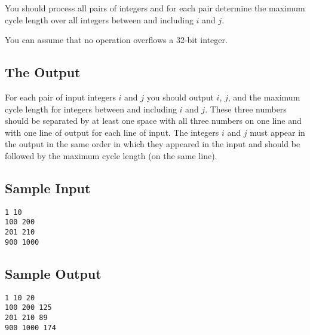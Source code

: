 You should process all pairs of integers and for each
pair determine the maximum cycle length over all integers between and
including $i$ and $j$.

You can assume that no operation overflows a 32-bit integer.


\subsection*{The Output}

For each pair of input integers $i$ and $j$ you should output $i$, $j$,
and the maximum cycle length for integers between and including
$i$ and $j$.  These three numbers
should be separated by at least one space with all three numbers on one
line and with one line of output for each line of input.  The integers
$i$ and $j$ must appear in the output in the same order in which they
appeared in the input and should be
followed by the maximum cycle length (on the same line).


\subsection*{Sample Input}
\begin{verbatim}
1 10
100 200
201 210
900 1000
\end{verbatim}

\subsection*{Sample Output}
\begin{verbatim}
1 10 20
100 200 125
201 210 89
900 1000 174
\end{verbatim}
